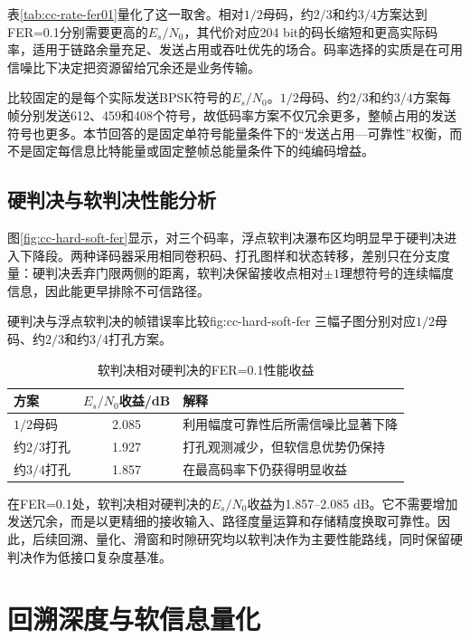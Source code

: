 表\ref{tab:cc-rate-fer01}量化了这一取舍。相对$1/2$母码，约$2/3$和约$3/4$方案达到FER=0.1分别需要更高的$E_s/N_0$，其代价对应204 bit的码长缩短和更高实际码率，适用于链路余量充足、发送占用或吞吐优先的场合。码率选择的实质是在可用信噪比下决定把资源留给冗余还是业务传输。

比较固定的是每个实际发送BPSK符号的$E_s/N_0$。$1/2$母码、约$2/3$和约$3/4$方案每帧分别发送612、459和408个符号，故低码率方案不仅冗余更多，整帧占用的发送符号也更多。本节回答的是固定单符号能量条件下的“发送占用---可靠性”权衡，而不是固定每信息比特能量或固定整帧总能量条件下的纯编码增益。

\subsection{硬判决与软判决性能分析}

图\ref{fig:cc-hard-soft-fer}显示，对三个码率，浮点软判决瀑布区均明显早于硬判决进入下降段。两种译码器采用相同卷积码、打孔图样和状态转移，差别只在分支度量：硬判决丢弃门限两侧的距离，软判决保留接收点相对$\pm1$理想符号的连续幅度信息，因此能更早排除不可信路径。

  {硬判决与浮点软判决的帧错误率比较}{fig:cc-hard-soft-fer}
  {三幅子图分别对应$1/2$母码、约$2/3$和约$3/4$打孔方案。}

\begin{table}[htbp]
  \centering
  \small
  \caption{软判决相对硬判决的FER=0.1性能收益}
  \label{tab:cc-soft-gain}
  \begin{tabular}{p{}c p{}}
    \toprule
    方案 & $E_s/N_0$收益/dB & 解释 \\
    \midrule
    $1/2$母码 & 2.085 & 利用幅度可靠性后所需信噪比显著下降 \\
    约$2/3$打孔 & 1.927 & 打孔观测减少，但软信息优势仍保持 \\
    约$3/4$打孔 & 1.857 & 在最高码率下仍获得明显收益 \\
    \bottomrule
  \end{tabular}
\end{table}

在FER=0.1处，软判决相对硬判决的$E_s/N_0$收益为1.857--2.085 dB。它不需要增加发送冗余，而是以更精细的接收输入、路径度量运算和存储精度换取可靠性。因此，后续回溯、量化、滑窗和时隙研究均以软判决作为主要性能路线，同时保留硬判决作为低接口复杂度基准。

\section{回溯深度与软信息量化}

